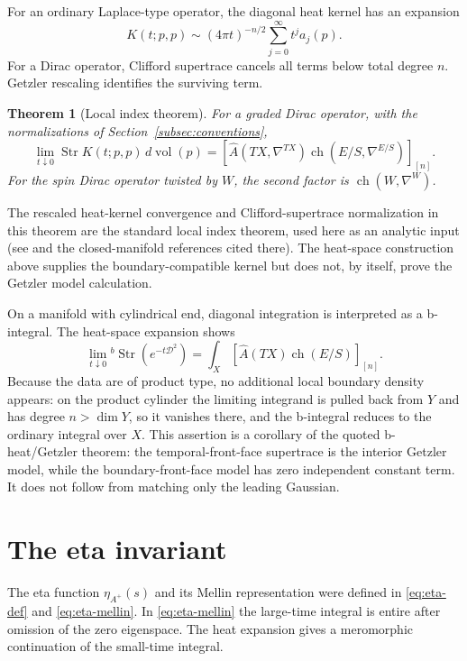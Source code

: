 \documentclass[12pt,oneside,reqno]{article}
\DeclareMathOperator{\Str}{Str}
\theoremstyle{plain}
\newtheorem{theorem}{Theorem}[section]
\theoremstyle{definition}
\theoremstyle{remark}
\begin{document}
For an ordinary Laplace-type operator, the diagonal heat kernel has an
expansion
\[
 K(t;p,p)
 \sim
 (4\pi t)^{-n/2}\sum_{j=0}^\infty t^j a_j(p).
\]
For a Dirac operator, Clifford supertrace cancels all terms below total
degree \(n\). Getzler rescaling identifies the surviving term.

\begin{theorem}[Local index theorem]
For a graded Dirac operator, with the normalizations of
Section~\ref{subsec:conventions},
\[
 \lim_{t\downarrow0}
 \operatorname{Str}K(t;p,p)\,d\operatorname{vol}(p)
 =
 \left[
 \widehat A(TX,\nabla^{TX})
 \operatorname{ch}(E/S,\nabla^{E/S})
 \right]_{[n]}.
\]
For the spin Dirac operator twisted by \(W\), the second factor is
\(\operatorname{ch}(W,\nabla^W)\).
\end{theorem}

The rescaled heat-kernel convergence and Clifford-supertrace
normalization in this theorem are the standard local index theorem, used
here as an analytic input (see \cite{Melrose} and the closed-manifold
references cited there). The heat-space construction above supplies the
boundary-compatible kernel but does not, by itself, prove the Getzler
model calculation.

On a manifold with cylindrical end, diagonal integration is interpreted as
a b-integral. The heat-space expansion shows
\[
 \lim_{t\downarrow0}{}^b\Str(e^{-t\mathcal D^2})
 =
 \int_X
 \left[
 \widehat A(TX)
 \operatorname{ch}(E/S)
 \right]_{[n]}.
\]
Because the data are of product type, no additional local boundary density
appears: on the product cylinder the limiting integrand is pulled back
from \(Y\) and has degree \(n>\dim Y\), so it vanishes there, and the
b-integral reduces to the ordinary integral over \(X\).  This assertion is a corollary of the quoted b-heat/Getzler
theorem: the temporal-front-face supertrace is the interior Getzler model,
while the boundary-front-face model has zero independent constant term.
It does not follow from matching only the leading Gaussian.

\section{The eta invariant}\label{sec:eta}

The eta function \(\eta_{A^+}(s)\) and its Mellin representation were
defined in \eqref{eq:eta-def} and \eqref{eq:eta-mellin}. In
\eqref{eq:eta-mellin} the large-time integral is entire after omission of the zero eigenspace.
The heat expansion gives a meromorphic continuation of the small-time
integral.
\end{document}
